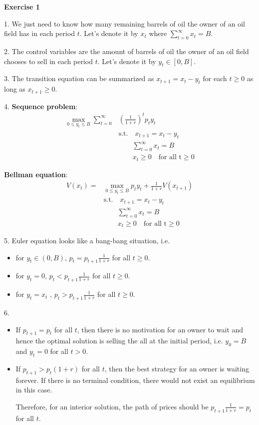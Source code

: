 \documentclass[12pt]{article}
\begin{document}
\textbf{Exercise 1}

1.  We just need to know how many remaining barrels of oil the owner of an oil field has in each period $t$. Let's denote it by $x_{t}$ where $\sum_{t=0}^{\infty} x_{t} = B$.

2. The control variables are the amount of barrels of oil the owner of an oil field chooses to sell in each period $t$. Let's denote it by $y_{t} \in [0,B]$.

3. The transition equation can be summarized as $x_{t+1} = x_{t} - y_{t}$ for each $t \geq 0$ as long as $x_{t+1} \geq 0$.

4. \textbf{Sequence problem}:
\begin{align*}
\max_{0 \leq y_{t} \leq B} \sum_{t=0}^{\infty} & {(\frac{1}{1+r})}^{t}p_{t}y_{t}  \\ & \text{s.t.} \quad  x_{t+1} = x_{t} - y_{t} \\ & \quad \quad \sum_{t=0}^{\infty} x_{t} = B  \\ & \quad \quad x_{t} \geq 0 \quad \text{for all t}\geq 0
\end{align*}


\textbf{Bellman equation}:
\begin{align*}
V(x_{t}) = & \max_{0 \leq y_{t} \leq B}  p_{t}y_{t} + \frac{1}{1+r} V(x_{t+1})   \\  & \text{s.t.} \quad  x_{t+1} = x_{t} - y_{t} \\ & \quad \quad \sum_{t=0}^{\infty} x_{t}= B  \\ & \quad \quad x_{t} \geq 0 \quad \text{for all t}\geq 0
\end{align*}

5. Euler equation looks like a bang-bang situation, i.e. 
\begin{itemize}
\item for $y_{t} \in (0,B)$, $p_{t} = p_{t+1}\frac{1}{1+r}$ for all $t \geq 0$.
\item for $y_{t} = 0$, $p_{t} < p_{t+1}\frac{1}{1+r}$ for all $t \geq 0$.
\item for $y_{t} = x_{t}$ , $p_{t} > p_{t+1}\frac{1}{1+r}$ for all $t \geq 0$.
\end{itemize}

\clearpage

6.  \begin{itemize} \item If $p_{t+1} = p_{t}$ for all $t$, then there is no motivation for an owner to wait and hence the optimal solution is selling the all at the initial period, i.e.  $y_{0} = B$ and $y_{t} = 0$ for all $t >0$. 
\item If $p_{t+1} > p_{t}(1+r)$ for all $t$, then the best strategy for an owner is waiting forever. If there is no terminal condition, there would not exist an equilibrium in this case. 

Therefore, for an interior solution, the path of prices should be $p_{t+1}\frac{1}{1+r} = p_{t}$ for all $t$.

\end{itemize}
\end{document}
